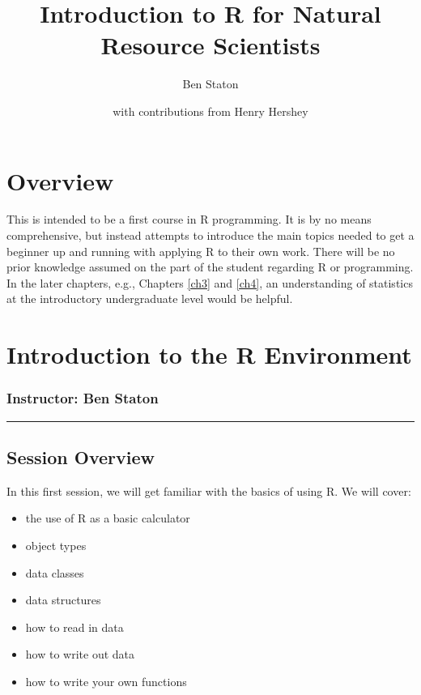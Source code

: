 \documentclass[]{book}
\title{Introduction to R for Natural Resource Scientists}
\author{Ben Staton}
\date{with contributions from Henry Hershey}
\providecommand{\tightlist}{%
  \setlength{\itemsep}{0pt}\setlength{\parskip}{0pt}}
\theoremstyle{definition}
\theoremstyle{definition}
\theoremstyle{definition}
\theoremstyle{remark}
\begin{document}
\maketitle

{
\setcounter{tocdepth}{1}
\tableofcontents
}
\chapter*{Overview}\label{overview}

This is intended to be a first course in R programming. It is by no
means comprehensive, but instead attempts to introduce the main topics
needed to get a beginner up and running with applying R to their own
work. There will be no prior knowledge assumed on the part of the
student regarding R or programming. In the later chapters, e.g.,
Chapters \ref{ch3} and \ref{ch4}, an understanding of statistics at the
introductory undergraduate level would be helpful.

\chapter{Introduction to the R Environment}\label{ch1}

\subsection{\texorpdfstring{\textbf{Instructor:} Ben
Staton}{Instructor: Ben Staton}}\label{instructor-ben-staton}

\begin{center}\rule{0.5\linewidth}{\linethickness}\end{center}

\section*{Session Overview}\label{session-overview}

In this first session, we will get familiar with the basics of using R.
We will cover:

\begin{itemize}
\tightlist
\item
  the use of R as a basic calculator
\item
  object types
\item
  data classes
\item
  data structures
\item
  how to read in data
\item
  how to write out data
\item
  how to write your own functions
\end{itemize}
\end{document}
